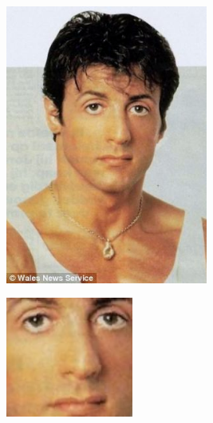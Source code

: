 \begin{figure}[H]
\begin{subfigure}{0.65\textwidth}
\end{subfigure}%
\begin{subfigure}{0.65\textwidth}
\begin{subfigure}{.33\textwidth}
  \centering
  \includegraphics[width=0.95\textwidth]{img/fdResult2/input82.png}
  \caption{}
\end{subfigure}%
\begin{subfigure}{.33\textwidth}
  \centering
  \includegraphics[width=0.6\textwidth]{img/fdResult2/output82.png}
  \caption{}
\end{subfigure}%
\end{subfigure}%


\end{figure}
